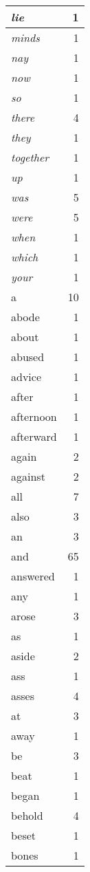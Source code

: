 \begin{center}
\begin{longtable}{l|r}
\emph{lie} & 1 \\ \hline
\emph{minds} & 1 \\ \hline
\emph{nay} & 1 \\ \hline
\emph{now} & 1 \\ \hline
\emph{so} & 1 \\ \hline
\emph{there} & 4 \\ \hline
\emph{they} & 1 \\ \hline
\emph{together} & 1 \\ \hline
\emph{up} & 1 \\ \hline
\emph{was} & 5 \\ \hline
\emph{were} & 5 \\ \hline
\emph{when} & 1 \\ \hline
\emph{which} & 1 \\ \hline
\emph{your} & 1 \\ \hline
a & 10 \\ \hline
abode & 1 \\ \hline
about & 1 \\ \hline
abused & 1 \\ \hline
advice & 1 \\ \hline
after & 1 \\ \hline
afternoon & 1 \\ \hline
afterward & 1 \\ \hline
again & 2 \\ \hline
against & 2 \\ \hline
all & 7 \\ \hline
also & 3 \\ \hline
an & 3 \\ \hline
and & 65 \\ \hline
answered & 1 \\ \hline
any & 1 \\ \hline
arose & 3 \\ \hline
as & 1 \\ \hline
aside & 2 \\ \hline
ass & 1 \\ \hline
asses & 4 \\ \hline
at & 3 \\ \hline
away & 1 \\ \hline
be & 3 \\ \hline
beat & 1 \\ \hline
began & 1 \\ \hline
behold & 4 \\ \hline
beset & 1 \\ \hline
bones & 1 \\ \hline

\end{longtable}
\end{center}
